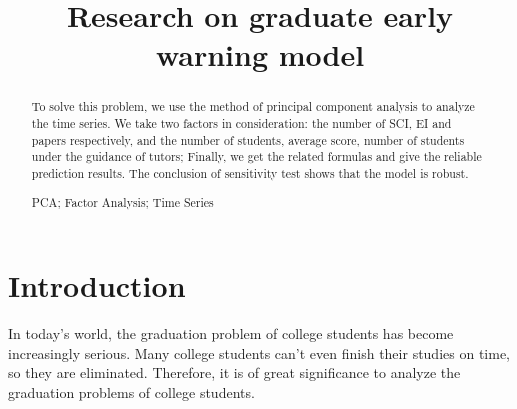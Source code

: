 \documentclass{mcmthesis}
\begin{document}

\begin{abstract}

	To solve this problem, we use the method of principal component analysis
	to analyze the time series. We take two factors in consideration: the
	number of SCI, EI and papers respectively, and the number of students,
	average score, number of students under the guidance of tutors; Finally,
	we get the related formulas and give the reliable prediction results.
	The conclusion of sensitivity test shows that the model is robust.

	\begin{keywords}
		PCA; Factor Analysis; Time Series
	\end{keywords}

\end{abstract}

\title{\textbf{Research on graduate early warning model}}
\maketitle


\tableofcontents

\newpage

\listoffigures
\listoftables
\listofexercises

\newpage

\section{Introduction}%
\label{sec:Introduction}

In today's world, the graduation problem of college students has become
increasingly serious. Many college students can't even finish their studies on
time, so they are eliminated. Therefore, it is of great significance to analyze
the graduation problems of college students.
\end{document}
